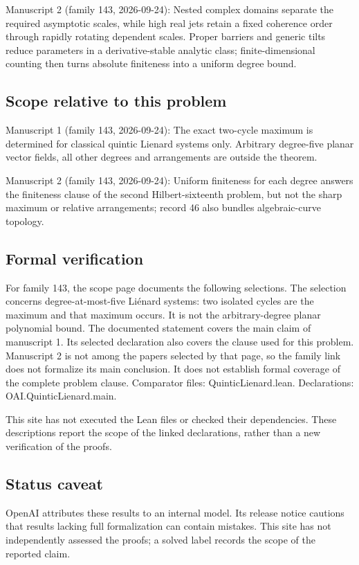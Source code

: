 \documentclass[11pt]{article}
\begin{document}
Manuscript 2 (family 143, 2026-09-24): Nested complex domains separate the required asymptotic scales, while high real jets retain a fixed coherence order through rapidly rotating dependent scales. Proper barriers and generic tilts reduce parameters in a derivative-stable analytic class; finite-dimensional counting then turns absolute finiteness into a uniform degree bound.

\subsection{Scope relative to this problem}
Manuscript 1 (family 143, 2026-09-24): The exact two-cycle maximum is determined for classical quintic Lienard systems only. Arbitrary degree-five planar vector fields, all other degrees and arrangements are outside the theorem.

Manuscript 2 (family 143, 2026-09-24): Uniform finiteness for each degree answers the finiteness clause of the second Hilbert-sixteenth problem, but not the sharp maximum or relative arrangements; record 46 also bundles algebraic-curve topology.

\subsection{Formal verification}
For family 143, the scope page documents the following selections. The selection concerns degree-at-most-five Liénard systems: two isolated cycles are the maximum and that maximum occurs. It is not the arbitrary-degree planar polynomial bound. The documented statement covers the main claim of manuscript 1. Its selected declaration also covers the clause used for this problem. Manuscript 2 is not among the papers selected by that page, so the family link does not formalize its main conclusion. It does not establish formal coverage of the complete problem clause. Comparator files: QuinticLienard.lean. Declarations: OAI.QuinticLienard.main.

This site has not executed the Lean files or checked their dependencies. These descriptions report the scope of the linked declarations, rather than a new verification of the proofs.

\subsection{Status caveat}
OpenAI attributes these results to an internal model. Its release notice cautions that results lacking full formalization can contain mistakes. This site has not independently assessed the proofs; a solved label records the scope of the reported claim.
\end{document}

